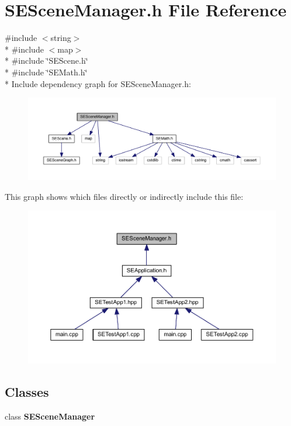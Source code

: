 \section{S\+E\+Scene\+Manager.\+h File Reference}
\label{_s_e_scene_manager_8h}
{\ttfamily \#include $<$string$>$}\\*
{\ttfamily \#include $<$map$>$}\\*
{\ttfamily \#include \char`\"{}S\+E\+Scene.\+h\char`\"{}}\\*
{\ttfamily \#include \char`\"{}S\+E\+Math.\+h\char`\"{}}\\*
Include dependency graph for S\+E\+Scene\+Manager.\+h\+:
\nopagebreak
\begin{figure}[H]
\begin{center}
\leavevmode
\includegraphics[width=350pt]{_s_e_scene_manager_8h__incl}
\end{center}
\end{figure}
This graph shows which files directly or indirectly include this file\+:
\nopagebreak
\begin{figure}[H]
\begin{center}
\leavevmode
\includegraphics[width=350pt]{_s_e_scene_manager_8h__dep__incl}
\end{center}
\end{figure}
\subsection*{Classes}
\begin{DoxyCompactItemize}
\item 
class {\bf S\+E\+Scene\+Manager}
\end{DoxyCompactItemize}
